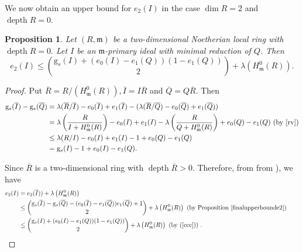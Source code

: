 \documentclass[reqno,a4paper,dvipsnames]{amsart}
\newcommand{\m}{\mathfrak{m} }
\newcommand{\depth}{\operatorname{depth}}
\newtheorem{proposition}[theorem]{Proposition}
\theoremstyle{definition}
\begin{document}
\normalsize



We now obtain an upper bound for $e_2(I)$ in the case $\dim R = 2$ and  $\depth R = 0$. 


\begin{proposition} \label{lw} 
    Let $(R,\m)$ be a two-dimensional Noetherian local ring with $\depth R =0.$ Let $I$ be an $\m$-primary ideal with minimal reduction of $Q$.   Then
    \begin{equation*}
    \label{eqn:lw}
         e_{2}(I) 
\leq  \binom{\mathrm{g}_{s}(I)+(e_{0}(I)-e_{1}(Q))\left(1-e_{1}(Q)\right)}{2}
+       \lambda\left(H_{\m}^{0}(R)\right).
    \end{equation*}
\end{proposition}

\begin{proof}
Put  $\overline{R}=R/\left(H_{\m}^{0}(R)\right), \overline{I}=I\overline{R}$ and $\overline{Q}=Q\overline{R}$.   Then 
\begin{align} \label{ccc} \nonumber
    \mathrm{g}_{s}(\overline{I}) -  \mathrm{g}_{s}(\overline{Q})
 &= \lambda(\overline{R}/\overline{I})-e_{0}(\overline{I})+e_{1}(\overline{I}) \nonumber
- ( \lambda(\overline{R}/\overline{Q})-e_{0}(\overline{Q})+e_{1}(\overline{Q})) \\ \nonumber
&= \lambda\left(\frac{R}{I + H_{\m}^{0}(R)}\right)-e_{0}({I})+e_{1}({I})
   -\lambda\left(\frac{R}{Q + H_{\m}^{0}(R)}\right)+e_{0}({Q})-e_{1}({Q}) 
     \mbox{ (by \cite[Proposition 2.3]{rv})}\\ \nonumber
&\leq \lambda({R}/{I})-e_{0}({I})+e_{1}({I}) -1+e_{0}(Q)-e_{1}(Q)\\
&= \mathrm{g}_s(I) - 1+e_{0}({I})-e_{1}({Q}).
 \end{align}
 

Since $\overline{R}$ is a two-dimensional ring with $\depth \overline{R} >0.$ Therefore, from from \cite[Proposition 2.3]{rv}), we have 
\begin{align} \nonumber
e_{2}(I)&=e_{2}(\overline{I}))+\lambda\left(H_{\m}^{0}(R)\right) \\\nonumber
& \leq \binom{\mathrm{g}_{s}(\overline{I})-\mathrm{g}_{s}(\overline{Q})-(e_{0}(\overline{I})-e_{1}(\overline{Q}))e_{1}(\overline{Q})+1}{2}+\lambda\left(H_{\m}^{0}(R)\right) \text{ (by Proposition \ref{finalupperbounde2})}\\ \nonumber\label{ddd}
    &\leq \binom{\mathrm{g}_{s}(I)+(e_{0}(I)-e_{1}(Q))(1-e_{1}(Q))}{2}+\lambda\left(H_{\m}^{0}(R)\right) \text{ (by (\ref{ccc})) }. &&\qedhere
\end{align} 
\end{proof}
\end{document}
